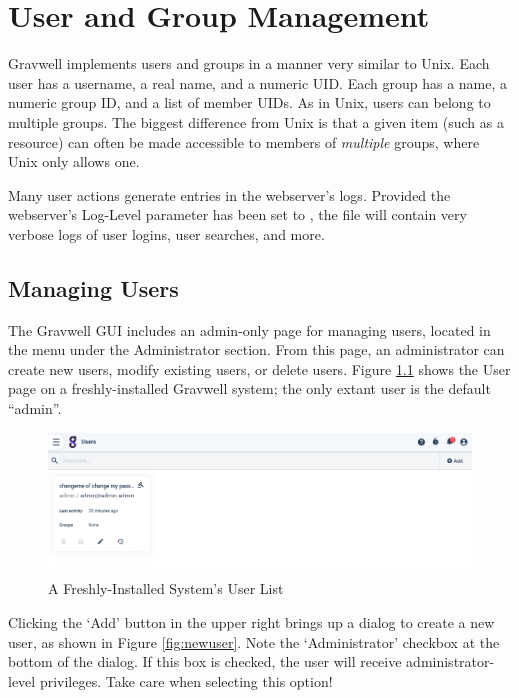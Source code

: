 \chapter{User and Group Management}

Gravwell implements users and groups in a manner very similar to Unix.
Each user has a username, a real name, and a numeric UID. Each group has
a name, a numeric group ID, and a list of member UIDs. As in Unix, users
can belong to multiple groups. The biggest difference from Unix is that
a given item (such as a resource) can often be made accessible to
members of \emph{multiple} groups, where Unix only allows one.

Many user actions generate entries in the webserver's logs. Provided
the webserver's Log-Level parameter has been set to , the
file  will contain very verbose logs
of user logins, user searches, and more.

\section{Managing Users}
The Gravwell GUI includes an admin-only page for managing users,
located in the menu under the Administrator section. From this page, an
administrator can create new users, modify existing users, or delete
users. Figure \ref{fig:fresh-users} shows the User page on a freshly-installed
Gravwell system; the only extant user is the default ``admin''.

\begin{figure}
	\includegraphics{images/users-admin.png}
	\caption{A Freshly-Installed System's User List}
	\label{fig:fresh-users}
\end{figure}

Clicking the `Add' button in the upper right brings up a dialog to
create a new user, as shown in Figure \ref{fig:newuser}. Note the 
`Administrator' checkbox at the bottom of the dialog. If this
box is checked, the user will receive administrator-level privileges.
Take care when selecting this option!


